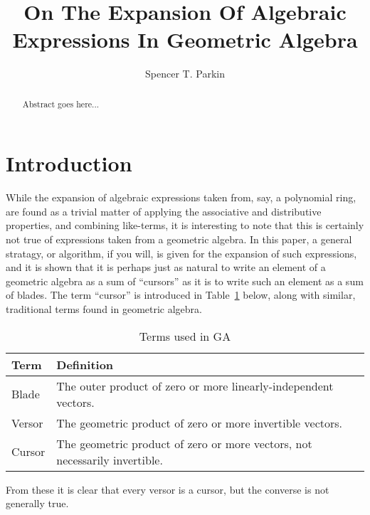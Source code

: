 \documentclass{birkjour}
\theoremstyle{definition}
\theoremstyle{remark}
\numberwithin{equation}{section}
\begin{document}
\title{On The Expansion Of Algebraic Expressions In Geometric Algebra}

\author{Spencer T. Parkin}



\begin{abstract}
Abstract goes here...
\end{abstract}


\maketitle

\section{Introduction}

While the expansion of algebraic expressions taken from, say, a polynomial ring, are found as a trivial matter
of applying the associative and distributive properties, and combining like-terms, it is interesting to note
that this is certainly not true of expressions taken from a geometric algebra.  In this paper, a general
stratagy, or algorithm, if you will, is given for the expansion of such expressions, and it is shown that
it is perhaps just as natural to write an element of a geometric algebra as a sum of ``cursors'' as it is to
write such an element as a sum of blades.  The term ``cursor'' is introduced in Table~\ref{tbl_terms} below,
along with similar, traditional terms found in geometric algebra.

\begin{table}[H]\label{tbl_terms}\caption{Terms used in GA}
\begin{tabular}{p{1cm}p{9cm}}
Term & Definition \\
\hline
Blade & The outer product of zero or more linearly-independent vectors. \\
Versor & The geometric product of zero or more invertible vectors. \\
Cursor & The geometric product of zero or more vectors, not necessarily invertible.
\end{tabular}
\end{table}

From these it is clear that every versor is a cursor, but the converse is not generally true.
\end{document}
